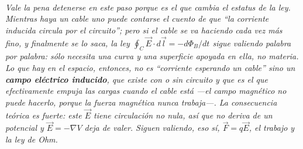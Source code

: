 \begin{center}
\begin{tikzpicture}[scale=1]
\end{tikzpicture}\\[0.5em]
{\small\itshape Vale la pena detenerse en este paso porque es el que cambia el
estatus de la ley. Mientras haya un cable uno puede contarse el cuento de que
``la corriente inducida circula por el circuito''; pero si el cable se va
haciendo cada vez más fino, y finalmente se lo saca, la ley
$\oint_C \vec E\cdot d\vec l = -d\Phi_B/dt$ sigue valiendo palabra por palabra:
sólo necesita una curva y una superficie apoyada en ella, no materia. Lo que hay
en el espacio, entonces, no es ``corriente esperando un cable'' sino un
\textbf{campo eléctrico inducido}, que existe con o sin circuito y que es el que
efectivamente empuja las cargas cuando el cable está ---el campo magnético no
puede hacerlo, porque la fuerza magnética nunca trabaja---. La consecuencia
teórica es fuerte: este $\vec E$ tiene circulación no nula, así que \emph{no}
deriva de un potencial y $\vec E = -\nabla V$ deja de valer. Siguen valiendo,
eso sí, $\vec F = q\vec E$, el trabajo y la ley de Ohm.}
\end{center}
